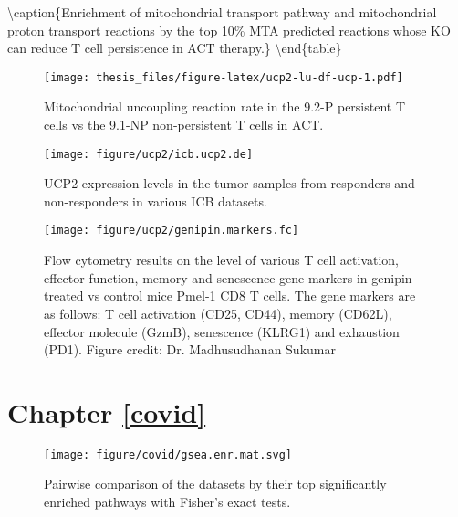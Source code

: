\documentclass[12pt,twoside,openany,\mydriver]{thesis}  %
\begin{document}
\textbackslash{}caption\{\label{tab:ucp2-lu-mta-mitotx-h}Enrichment of mitochondrial transport pathway and mitochondrial proton transport reactions by the top 10\% MTA predicted reactions whose KO can reduce T cell persistence in ACT therapy.\}
\centering
{}
\textbackslash{}end\{table\}
\begin{figure}
\centering
\texttt{[image: thesis\_files/figure-latex/ucp2-lu-df-ucp-1.pdf]}
\caption{\label{fig:ucp2-lu-df-ucp}Mitochondrial uncoupling reaction rate in the 9.2-P persistent T cells vs the 9.1-NP non-persistent T cells in ACT.}
\end{figure}
\begin{figure}
\texttt{[image: figure/ucp2/icb.ucp2.de]} \caption{UCP2 expression levels in the tumor samples from responders and non-responders in various ICB datasets.}\label{fig:ucp2-icb-ucp2-de}
\end{figure}
\begin{figure}
\texttt{[image: figure/ucp2/genipin.markers.fc]} \caption{Flow cytometry results on the level of various T cell activation, effector function, memory and senescence gene markers in genipin-treated vs control mice Pmel-1 CD8 T cells. The gene markers are as follows: T cell activation (CD25, CD44), memory (CD62L), effector molecule (GzmB), senescence (KLRG1) and exhaustion (PD1). Figure credit: Dr. Madhusudhanan Sukumar}\label{fig:ucp2-genipin-fc}
\end{figure}
\hypertarget{chapter-refcovid}{%
\section*{Chapter \ref{covid}}\label{chapter-refcovid}}
\begin{figure}
\texttt{[image: figure/covid/gsea.enr.mat.svg]} \caption{Pairwise comparison of the datasets by their top significantly enriched pathways with Fisher's exact tests.}\label{fig:covid-gsea-mat}
\end{figure}
\end{document}
